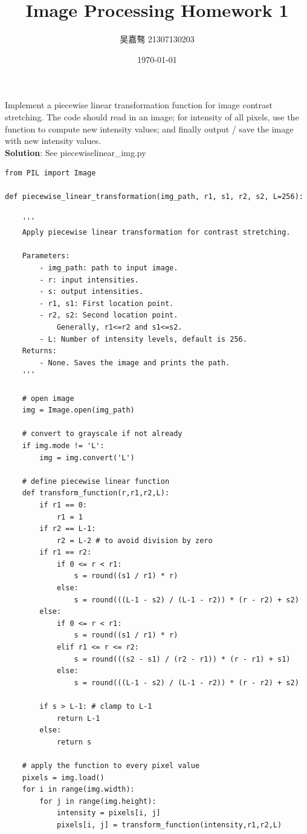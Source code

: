\documentclass[UTF8]{ctexart}
\title{\textbf{Image Processing Homework 1}}
\author{吴嘉骜 21307130203}
\date{\today}
\begin{document}
\maketitle

\noindent
\section{}
\setlength{\parindent}{0pt}
Implement a piecewise linear transformation function for image contrast stretching. The code should read in an image; 
for intensity of all pixels, use the function to compute new intensity values; and finally output / save the image with new intensity values.\\
\textbf{Solution}: See piecewiselinear\_img.py
\begin{lstlisting}
from PIL import Image

def piecewise_linear_transformation(img_path, r1, s1, r2, s2, L=256):
    
    '''
    Apply piecewise linear transformation for contrast stretching.
    
    Parameters:
        - img_path: path to input image.
        - r: input intensities.
        - s: output intensities.
        - r1, s1: First location point.
        - r2, s2: Second location point.
            Generally, r1<=r2 and s1<=s2.
        - L: Number of intensity levels, default is 256.
    Returns:
        - None. Saves the image and prints the path.
    '''

    # open image
    img = Image.open(img_path)
    
    # convert to grayscale if not already
    if img.mode != 'L':
        img = img.convert('L')

    # define piecewise linear function
    def transform_function(r,r1,r2,L):
        if r1 == 0:
            r1 = 1
        if r2 == L-1:
            r2 = L-2 # to avoid division by zero
        if r1 == r2:
            if 0 <= r < r1:
                s = round((s1 / r1) * r)
            else:
                s = round(((L-1 - s2) / (L-1 - r2)) * (r - r2) + s2)
        else:
            if 0 <= r < r1:
                s = round((s1 / r1) * r)
            elif r1 <= r <= r2:
                s = round(((s2 - s1) / (r2 - r1)) * (r - r1) + s1)
            else:
                s = round(((L-1 - s2) / (L-1 - r2)) * (r - r2) + s2)
        
        if s > L-1: # clamp to L-1
            return L-1
        else:
            return s
    
    # apply the function to every pixel value
    pixels = img.load()
    for i in range(img.width):
        for j in range(img.height):
            intensity = pixels[i, j]
            pixels[i, j] = transform_function(intensity,r1,r2,L)


\end{lstlisting}
\end{document}
